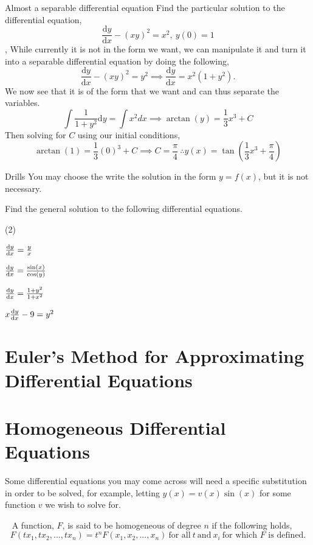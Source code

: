 \documentclass[../../main.tex]{subfiles}
\begin{document}
\begin{example}{Almost a separable differential equation}
Find the particular solution to the differential equation,
$$\frac{\mathrm{d}y}{\mathrm{d}x}-(xy)^2=x^2, \ y(0)=1$$
\sep
While currently it is not in the form we want, we can manipulate it and turn it into a separable differential equation by doing the following,
$$\frac{\mathrm{d}y}{\mathrm{d}x}-(xy)^2=y^2 \implies \frac{\mathrm{d}y}{\mathrm{d}x}=x^2(1+y^2).$$
We now see that it is of the form that we want and can thus separate the variables.
$$\int \frac{1}{1+y^2}\mathrm{d}y=\int x^2dx \implies \arctan(y)=\frac{1}{3}x^3+C$$
Then solving for $C$ using our initial conditions,
$$\arctan(1)=\frac{1}{3}(0)^3+C \implies C=\frac{\pi}{4} \ \therefore y(x)=\tan\left(\frac{1}{3}x^3+\frac{\pi}{4}\right)$$
\end{example}
\begin{questions}{Drills}
You may choose the write the solution in the form $y=f(x)$, but it is not necessary.

\vspace{5pt}
Find the general solution to the following differential equations.
\vspace{5pt}
\begin{question_set}(2)
\item $\dv{y}{x}=\frac{y}{x}$
\item $\dv{y}{x}=\frac{\sin(x)}{\cos(y)}$ \\
\item $\dv{y}{x}=\frac{1+y^2}{1+x^2}$
\item $x\dv{y}{x}-9=y^2$
\end{question_set}
\smallskip
\end{questions}

\section{Euler's Method for Approximating Differential Equations}



\section{Homogeneous Differential Equations}
Some differential equations you may come across will need a specific substitution in order to be solved, for example, letting $y(x)=v(x)\sin(x)$ for some function $v$ we wish to solve for.
\begin{definition}{~}
A function, $F$, is said to be homogeneous of degree $n$ if the following holds,
$$F(tx_1,tx_2,...,tx_n)=t^nF(x_1,x_2,...,x_n) \ \text{for all} \ t \ \text{and} \ x_i \ \text{for which $F$ is defined.}$$
\end{definition}
\end{document}
